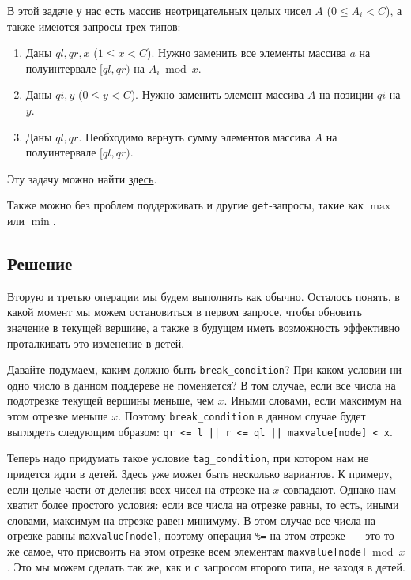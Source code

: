 В этой задаче у нас есть массив неотрицательных целых чисел $A$ ($0 \le A_i < C$), а также имеются запросы трех типов:

\begin{enumerate}
    \item Даны $ql, qr, x$ ($1 \le x < C$). Нужно заменить все элементы массива $a$ на полуинтервале $[ql, qr)$ на $A_i \bmod x$.
    \item Даны $qi, y$ ($0 \le y < C$). Нужно заменить элемент массива $A$ на позиции $qi$ на $y$.
    \item Даны $ql, qr$. Необходимо вернуть сумму элементов массива $A$ на полуинтервале $[ql, qr)$.
\end{enumerate}

Эту задачу можно найти \href{https://codeforces.com/contest/438/problem/D}{здесь}.

Также можно без проблем поддерживать и другие \verb+get+-запросы, такие как $\max$ или $\min$.

\subsection{Решение}

Вторую и третью операции мы будем выполнять как обычно. Осталось понять, в какой момент мы можем остановиться в первом запросе, чтобы обновить значение в текущей вершине, а также в будущем иметь возможность эффективно проталкивать это изменение в детей.

Давайте подумаем, каким должно быть \verb+break_condition+? При каком условии ни одно число в данном поддереве не поменяется? В том случае, если все числа на подотрезке текущей вершины меньше, чем $x$. Иными словами, если максимум на этом отрезке меньше $x$. Поэтому \verb+break_condition+ в данном случае будет выглядеть следующим образом: \verb+qr <= l || r <= ql || maxvalue[node] < x+.

Теперь надо придумать такое условие \verb+tag_condition+, при котором нам не придется идти в детей. Здесь уже может быть несколько вариантов. К примеру, если целые части от деления всех чисел на отрезке на $x$ совпадают. Однако нам хватит более простого условия: если все числа на отрезке равны, то есть, иными словами, максимум на отрезке равен минимуму. В этом случае все числа на отрезке равны \verb+maxvalue[node]+, поэтому операция \verb+%=+ на этом отрезке~--- это то же самое, что присвоить на этом отрезке всем элементам \verb+maxvalue[node]+$\bmod x$. Это мы можем сделать так же, как и с запросом второго типа, не заходя в детей.

